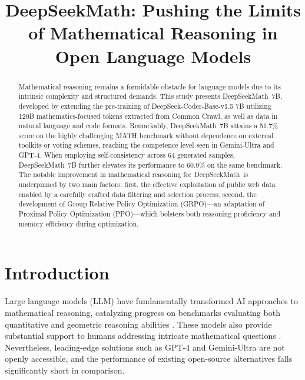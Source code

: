 \title{DeepSeekMath: Pushing the Limits of Mathematical Reasoning in Open Language Models}

\begin{abstract}
Mathematical reasoning remains a formidable obstacle for language models due to its intrinsic complexity and structured demands. This study presents DeepSeekMath~7B, developed by extending the pre-training of DeepSeek-Coder-Base-v1.5 7B utilizing 120B mathematics-focused tokens extracted from Common Crawl, as well as data in natural language and code formats. Remarkably, DeepSeekMath~7B attains a 51.7\% score on the highly challenging MATH benchmark without dependence on external toolkits or voting schemes, reaching the competence level seen in Gemini-Ultra and GPT-4. When employing self-consistency across 64 generated samples, DeepSeekMath~7B further elevates its performance to 60.9\% on the same benchmark. The notable improvement in mathematical reasoning for DeepSeekMath~is underpinned by two main factors: first, the effective exploitation of public web data enabled by a carefully crafted data filtering and selection process; second, the development of Group Relative Policy Optimization (GRPO)—an adaptation of Proximal Policy Optimization (PPO)—which bolsters both reasoning proficiency and memory efficiency during optimization.
\end{abstract}

\section{Introduction}

Large language models (LLM) have fundamentally transformed AI approaches to mathematical reasoning, catalyzing progress on benchmarks evaluating both quantitative \citep{MATH} and geometric reasoning abilities \citep{trinh2024solving}. These models also provide substantial support to humans addressing intricate mathematical questions \citep{tao}. Nevertheless, leading-edge solutions such as GPT-4 \citep{gpt4} and Gemini-Ultra \citep{gemini} are not openly accessible, and the performance of existing open-source alternatives falls significantly short in comparison.

